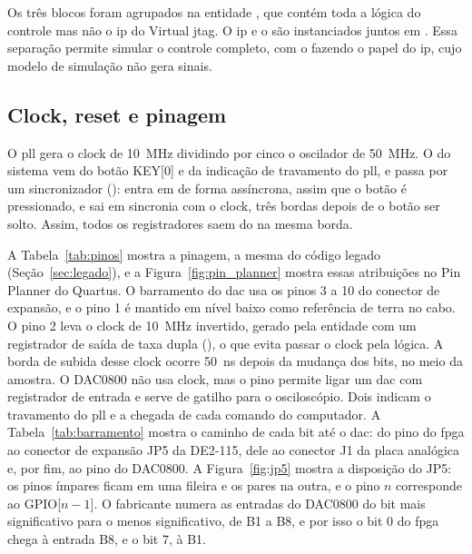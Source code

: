 Os três blocos foram agrupados na entidade , que contém toda a lógica do controle mas não o \ac{ip} do Virtual \ac{jtag}. O \ac{ip} e o  são instanciados juntos em . Essa separação permite simular o controle completo, com o  fazendo o papel do \ac{ip}, cujo modelo de simulação não gera sinais.

\subsection{Clock, reset e pinagem}

O \ac{pll} gera o clock de 10~MHz dividindo por cinco o oscilador de 50~MHz. O  do sistema vem do botão KEY[0] e da indicação de travamento do \ac{pll}, e passa por um sincronizador (): entra em  de forma assíncrona, assim que o botão é pressionado, e sai em sincronia com o clock, três bordas depois de o botão ser solto. Assim, todos os registradores saem do  na mesma borda.

A Tabela~\ref{tab:pinos} mostra a pinagem, a mesma do código legado (Seção~\ref{sec:legado}), e a Figura~\ref{fig:pin_planner} mostra essas atribuições no Pin Planner do Quartus. O barramento do \ac{dac} usa os pinos 3 a 10 do conector de expansão, e o pino 1 é mantido em nível baixo como referência de terra no cabo. O pino 2 leva o clock de 10~MHz invertido, gerado pela entidade  com um registrador de saída de taxa dupla (), o que evita passar o clock pela lógica. A borda de subida desse clock ocorre 50~ns depois da mudança dos bits, no meio da amostra. O DAC0800 não usa clock, mas o pino permite ligar um \ac{dac} com registrador de entrada e serve de gatilho para o osciloscópio. Dois  indicam o travamento do \ac{pll} e a chegada de cada comando do computador. A Tabela~\ref{tab:barramento} mostra o caminho de cada bit até o \acs{dac}: do pino do \acs{fpga} ao conector de expansão JP5 da DE2-115, dele ao conector J1 da placa analógica e, por fim, ao pino do DAC0800. A Figura~\ref{fig:jp5} mostra a disposição do JP5: os pinos ímpares ficam em uma fileira e os pares na outra, e o pino \(n\) corresponde ao GPIO[\(n - 1\)]. O fabricante numera as entradas do DAC0800 do bit mais significativo para o menos significativo, de B1 a B8, e por isso o bit 0 do \acs{fpga} chega à entrada B8, e o bit 7, à B1.

